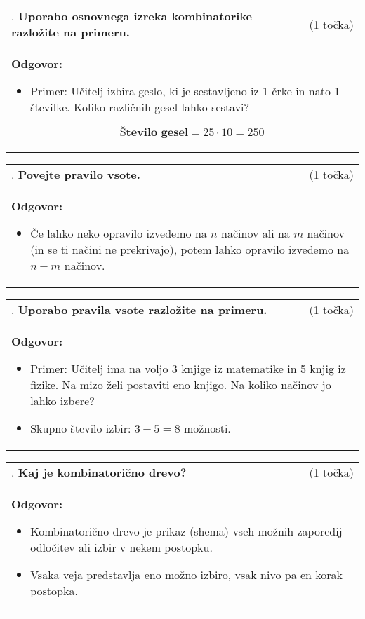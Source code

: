 \documentclass[12pt]{article}
\newcounter{vprasanje}[section]
\renewcommand{\thevprasanje}{\roman{vprasanje}}
\newcommand{\vprasanje}[2]{%
  \stepcounter{vprasanje}%
  \textbf{\thevprasanje}. \textbf{#1} & (#2) \\
}
\newcommand{\odgovor}[1]{%
  \multicolumn{2}{p{\dimexpr\textwidth-2\tabcolsep\relax}}{%
    \small \textbf{Odgovor:} #1%
  } \\[1em]%
}
\begin{document}
\begin{tabularx}{\textwidth}{X r}
\vprasanje{Uporabo osnovnega izreka kombinatorike razložite na primeru.}{1 točka}
\odgovor{
\begin{itemize}
  \item Primer: Učitelj izbira geslo, ki je sestavljeno iz 1 črke in nato 1 številke. Koliko različnih gesel lahko sestavi?
  
  \[
  \textbf{Število gesel} = 25 \cdot 10 = 250
  \]
  
\end{itemize}
}
\end{tabularx}

\begin{tabularx}{\textwidth}{X r}
\vprasanje{Povejte pravilo vsote.}{1 točka}
\odgovor{
\begin{itemize}
  \item Če lahko neko opravilo izvedemo na $n$ načinov ali na $m$ načinov (in se ti načini ne prekrivajo), potem lahko opravilo izvedemo na $n + m$ načinov.
\end{itemize}
}
\end{tabularx}

\begin{tabularx}{\textwidth}{X r}
\vprasanje{Uporabo pravila vsote razložite na primeru.}{1 točka}
\odgovor{
\begin{itemize}
  \item Primer: Učitelj ima na voljo 3 knjige iz matematike in 5 knjig iz fizike. Na mizo želi postaviti eno knjigo. Na koliko načinov jo lahko izbere?
  \item Skupno število izbir: $3 + 5 = 8$ možnosti.
\end{itemize}
}
\end{tabularx}

\begin{tabularx}{\textwidth}{X r}
\vprasanje{Kaj je kombinatorično drevo?}{1 točka}
\odgovor{
\begin{itemize}
  \item Kombinatorično drevo je prikaz (shema) vseh možnih zaporedij odločitev ali izbir v nekem postopku.
  \item Vsaka veja predstavlja eno možno izbiro, vsak nivo pa en korak postopka.
\end{itemize}
}
\end{tabularx}
\end{document}
